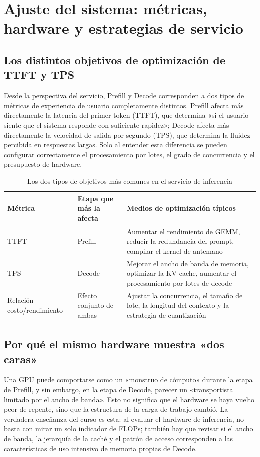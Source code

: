 \section{Ajuste del sistema: métricas, hardware y estrategias de servicio}

\subsection{Los distintos objetivos de optimización de TTFT y TPS}
Desde la perspectiva del servicio, Prefill y Decode corresponden a dos tipos de métricas de experiencia de usuario completamente distintos. Prefill afecta más directamente la latencia del primer token (TTFT), que determina «si el usuario siente que el sistema responde con suficiente rapidez»; Decode afecta más directamente la velocidad de salida por segundo (TPS), que determina la fluidez percibida en respuestas largas. Solo al entender esta diferencia se pueden configurar correctamente el procesamiento por lotes, el grado de concurrencia y el presupuesto de hardware.

\begin{table}[H]
\centering
\caption{Los dos tipos de objetivos más comunes en el servicio de inferencia}
\begin{tabular}{p{3.2cm}p{4.8cm}p{4.5cm}}
\toprule
Métrica & Etapa que más la afecta & Medios de optimización típicos \\
\midrule
TTFT & Prefill & Aumentar el rendimiento de GEMM, reducir la redundancia del prompt, compilar el kernel de antemano \\
TPS & Decode & Mejorar el ancho de banda de memoria, optimizar la KV cache, aumentar el procesamiento por lotes de decode \\
Relación costo/rendimiento & Efecto conjunto de ambas & Ajustar la concurrencia, el tamaño de lote, la longitud del contexto y la estrategia de cuantización \\
\bottomrule
\end{tabular}
\end{table}

\subsection{Por qué el mismo hardware muestra «dos caras»}
Una GPU puede comportarse como un «monstruo de cómputo» durante la etapa de Prefill, y sin embargo, en la etapa de Decode, parecer un «transportista limitado por el ancho de banda». Esto no significa que el hardware se haya vuelto peor de repente, sino que la estructura de la carga de trabajo cambió. La verdadera enseñanza del curso es esta: al evaluar el hardware de inferencia, no basta con mirar un solo indicador de FLOPs; también hay que revisar si el ancho de banda, la jerarquía de la caché y el patrón de acceso corresponden a las características de uso intensivo de memoria propias de Decode.

